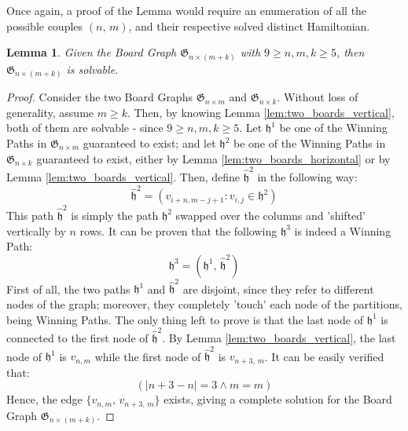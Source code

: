 \documentclass[conference]{IEEEtran}
\newtheorem{lemma}{Lemma}[section]
\begin{document}
Once again, a proof of the Lemma would require an enumeration of all the possible couples $(n,\,m)$, and their respective solved distinct Hamiltonian.
\begin{lemma} \label{lem:tiling_vertical}
    Given the Board Graph $\mathfrak{G}_{n \times (m + k)}$ with $9 \ge n, m, k \ge 5$, then $\mathfrak{G}_{n \times (m + k)}$ is solvable.
\end{lemma}
\begin{proof}
    Consider the two Board Graphs $\mathfrak{G}_{n \times m}$ and $\mathfrak{G}_{n \times k}$.
    Without loss of generality, assume $m \ge k$. Then, by knowing Lemma \ref{lem:two_boards_vertical}, both of them are solvable - since $9 \ge n, m, k \ge 5$.
    Let $\mathfrak{h}^1$ be one of the Winning Paths in $\mathfrak{G}_{n \times m}$ guaranteed to exist;
        and let $\mathfrak{h}^2$ be one of the Winning Paths in $\mathfrak{G}_{n \times k}$ guaranteed to exist, either by Lemma \ref{lem:two_boards_horizontal} or by Lemma \ref{lem:two_boards_vertical}.
    Then, define $\hat{\mathfrak{h}}^2$ in the following way:
    $$
        \hat{\mathfrak{h}}^2 = (v_{i + n, m - j + 1} : v_{i,j} \in \mathfrak{h}^2)
    $$
    This path $\hat{\mathfrak{h}}^2$ is simply the path $\mathfrak{h}^2$ swapped over the columns and 'shifted' vertically by $n$ rows.
        It can be proven that the following $\mathfrak{h}^3$ is indeed a Winning Path:
    $$
        \mathfrak{h}^3 = (\mathfrak{h}^1,\,\hat{\mathfrak{h}}^2)
    $$
    First of all, the two paths $\mathfrak{h}^1$ and $\hat{\mathfrak{h}}^2$ are disjoint, since they refer to different nodes of the graph; moreover, they completely 'touch' each node of the partitions, being Winning Paths.
    The only thing left to prove is that the last node of $\mathfrak{h}^1$ is connected to the first node of $\hat{\mathfrak{h}}^2$.
    By Lemma \ref{lem:two_boards_vertical}, the last node of $\mathfrak{h}^1$ is $v_{n,m}$ while the first node of $\hat{\mathfrak{h}}^2$ is $v_{n+3,\,m}$.
    It can be easily verified that:
    $$
        (|n+3 - n| = 3 \land m = m)
    $$
    Hence, the edge $\{v_{n,m},\,v_{n+3,\,m}\}$ exists, giving a complete solution for the Board Graph $\mathfrak{G}_{n \times (m + k)}$.
\end{proof}
\end{document}
